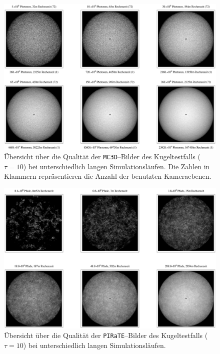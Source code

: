\documentclass[
	12pt,
	a4paper,
	pagesize=auto,
	DIV=10,
	parskip=half,
	titlepage,
	twoside,
	listof=totoc,
	bibliography=totocnumbered,
	final%
]{scrbook}
\begin{document}
		\begin{figure}
			\centering
			\vspace{-1em}
			\includegraphics[angle=90,height=1.0\textheight]{mc3dsphereimageoverview3.eps}
			\caption{Übersicht über die Qualität der \texttt{MC3D}--Bilder des Kugeltestfalls ($\tau=10$) bei unterschiedlich langen Simulationsläufen. Die Zahlen in Klammern repräsentieren die Anzahl der benutzten Kameraebenen.}
			\label{fig:mc3dsphere_image_overview3}
		\end{figure}
		\begin{figure}
			\centering
			\vspace{-1em}
			\includegraphics[angle=90,height=1.0\textheight]{piratesphereimageoverview3.eps}
			\caption{Übersicht über die Qualität der \texttt{PIRaTE}--Bilder des Kugeltestfalls ($\tau=10$) bei unterschiedlich langen Simulationsläufen.}
			\label{fig:piratesphere_image_overview3}
		\end{figure}
		
\end{document}
